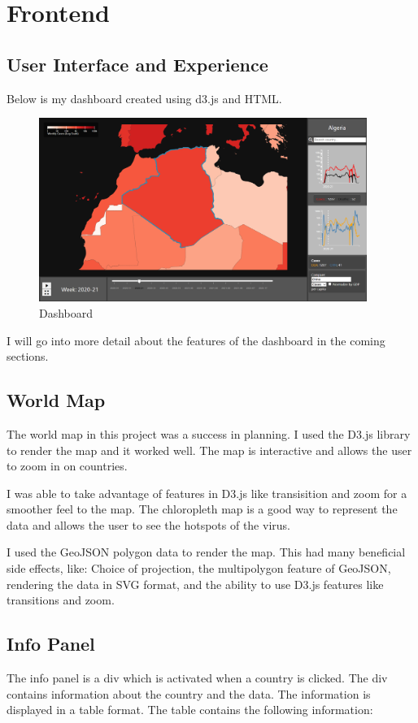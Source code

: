 \documentclass{report}
\begin{document}
\section{Frontend}

\subsection{User Interface and Experience}
Below is my dashboard created using d3.js and HTML.
\begin{center}
    \begin{figure}[h]
        \centering
        \includegraphics[width=0.95\textwidth]{Images/dashboard.png}
        \caption{Dashboard}
        \label{fig:dashboard}
    \end{figure}
\end{center}
I will go into more detail about the features of the dashboard in the coming sections.
\subsection{World Map}
The world map in this project was a success in planning. I used the D3.js library to render the map and it worked well. The map is interactive and allows the user to zoom in on countries.

I was able to take advantage of features in D3.js like transisition and zoom for a smoother feel to the map. The chloropleth map is a good way to represent the data and allows the user to see the hotspots of the virus.

I used the GeoJSON polygon data to render the map. This had many beneficial side effects, like: Choice of projection, the multipolygon feature of GeoJSON, rendering the data in SVG format, and the ability to use D3.js features like transitions and zoom.

\subsection{Info Panel}
The info panel is a div which is activated when a country is clicked. The div contains information about the country and the data. The information is displayed in a table format. The table contains the following information:
\end{document}
